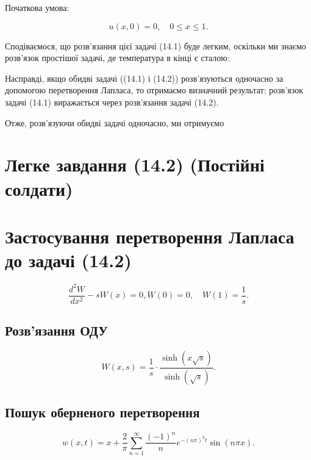 \documentclass[
  ukrainian,
]{article}
\begin{document}
Початкова умова:

\[
u(x, 0) = 0, \quad 0 \le x \le 1.
\]

Сподіваємося, що розв'язання цієї задачі (14.1) буде легким, оскільки ми
знаємо розв'язок простішої задачі, де температура в кінці є сталою:

Насправді, якщо обидві задачі ((14.1) і (14.2)) розв'язуються одночасно
за допомогою перетворення Лапласа, то отримаємо визначний результат:
розв'язок задачі (14.1) виражається через розв'язання задачі (14.2).

Отже, розв'язуючи обидві задачі одночасно, ми отримуємо

\section{Легке завдання (14.2) (Постійні
солдати)}\label{ux43bux435ux433ux43aux435-ux437ux430ux432ux434ux430ux43dux43dux44f-14.2-ux43fux43eux441ux442ux456ux439ux43dux456-ux441ux43eux43bux434ux430ux442ux438}

\section{Застосування перетворення Лапласа до задачі
(14.2)}\label{ux437ux430ux441ux442ux43eux441ux443ux432ux430ux43dux43dux44f-ux43fux435ux440ux435ux442ux432ux43eux440ux435ux43dux43dux44f-ux43bux430ux43fux43bux430ux441ux430-ux434ux43e-ux437ux430ux434ux430ux447ux456-14.2}

\[
\frac{d^2 W}{dx^2} - s W(x) = 0,
W(0) = 0, \quad W(1) = \frac{1}{s}.
\]

\subsection{Розв'язання
ОДУ}\label{ux440ux43eux437ux432ux44fux437ux430ux43dux43dux44f-ux43eux434ux443}

\[
W(x, s) = \frac{1}{s} \cdot \frac{\sinh(x \sqrt{s})}{\sinh(\sqrt{s})}.
\]

\subsection{Пошук оберненого
перетворення}\label{ux43fux43eux448ux443ux43a-ux43eux431ux435ux440ux43dux435ux43dux43eux433ux43e-ux43fux435ux440ux435ux442ux432ux43eux440ux435ux43dux43dux44f}

\[
w(x, t) = x + \frac{2}{\pi} \sum_{n=1}^{\infty} \frac{(-1)^n}{n} e^{-(n\pi)^2 t} \sin(n\pi x).
\]
\end{document}
